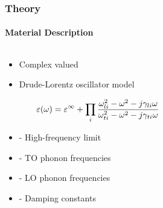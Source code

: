 \documentclass[mathserif,18pt,xcolor=table]{beamer}
\begin{document}
\begin{frame}
  \frametitle{Theory}
  \framesubtitle{Material Description}
  \begin{columns}[T] %
    \begin{column}{.5\textwidth}
      \begin{itemize}
        \item Complex valued
        \item Drude-Lorentz oscillator model
      \end{itemize}
      \begin{equation} \nonumber
        \varepsilon(\omega) = \varepsilon^{\infty} + \prod_i\frac{\omega_{li}^2 - \omega^2 - j\gamma_{li} \omega}{\omega_{ti}^2 - \omega^2 - j\gamma_{ti} \omega}
        \label{eq:eps}
      \end{equation}
      \begin{itemize}
        \item[]{\makebox[.3cm][l]{$\E^{\inf}$} - High-frequency limit}
        \item[]{ - TO phonon frequencies}
        \item[]{ - LO phonon frequencies}
        \item[]{\makebox[.3cm][l]{$\gamma$} - Damping constants}
      \end{itemize}
    \end{column}
    \begin{column}[T]{.5\textwidth}
      \begin{figure}
        \vspace*{-2cm}
        \subfloat[]{
        \label{fig:eps_Ga}}
        \vspace*{0cm}
      \end{figure}
      \end{column}%
    \end{columns}
  \end{frame}
\end{document}
